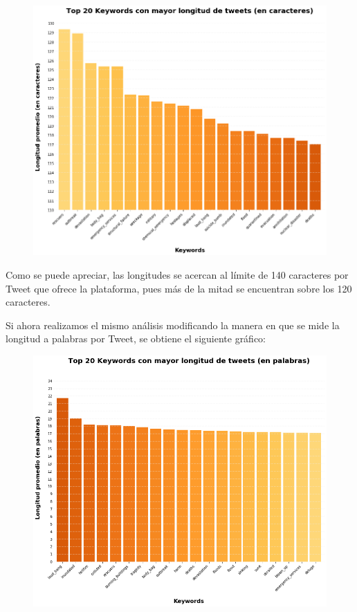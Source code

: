 \documentclass[titlepage,a4paper]{article}
\begin{document}
    \begin{figure}[H]
    \centering
    \includegraphics[width=1\textwidth]{graficos/Analisis de Keyword/top_20_long_con_mayor_long_de_tweets.png}
    \caption{} 
    \end{figure}
    
    Como se puede apreciar, las longitudes se acercan al límite de 140 caracteres por Tweet que ofrece la plataforma, pues más de la mitad se encuentran sobre los 120 caracteres. 
    
    Si ahora realizamos el mismo análisis modificando la manera en que se mide la longitud a palabras por Tweet, se obtiene el siguiente gráfico:
    
    \begin{figure}[H]
    \centering
    \includegraphics[width=1\textwidth]{graficos/Analisis de Keyword/top_20_keywords_con_mayor_long_de_tweets_en_palabras.png}
    \caption{} 
    \end{figure}
     
\end{document}
